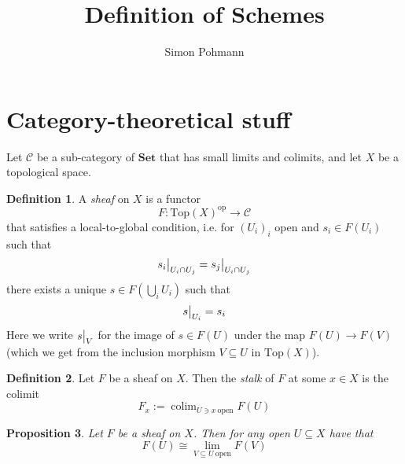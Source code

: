 \documentclass{scrartcl}
\title{Definition of Schemes}
\author{Simon Pohmann}
\newcommand{\Set}{\mathrm{\textbf{Set}}}
\newcommand{\Top}{\mathrm{Top}}
\DeclareMathOperator*{\colim}{colim}
\newcommand\restr[2]{{
    \left.\kern-\nulldelimiterspace
    #1
    \vphantom{\big|}
    \right|_{#2}
}}
\newtheorem{prop}{Proposition}[section]
\theoremstyle{definition}
\newtheorem{definition}[prop]{Definition}
\begin{document}
\maketitle
\tableofcontents

\section{Category-theoretical stuff}
Let $\mathcal{C}$ be a sub-category of $\Set$ that has small limits and colimits, and let $X$ be a topological space.
\begin{definition}
    A \emph{sheaf} on $X$ is a functor
    \begin{equation*}
        F: \Top(X)^{\mathrm{op}} \to \mathcal{C}
    \end{equation*}
    that satisfies a local-to-global condition, i.e. for $(U_i)_i$ open and $s_i \in F(U_i)$ such that
    \begin{equation*}
        \restr{s_i}{U_i \cap U_j} = \restr{s_j}{U_i \cap U_j}
    \end{equation*}
    there exists a unique $s \in F(\bigcup_i U_i)$ such that
    \begin{equation*}
        \restr{s}{U_i} = s_i
    \end{equation*}
    Here we write $\restr{s}{V}$ for the image of $s \in F(U)$ under the map $F(U) \to F(V)$ (which we get from the inclusion morphism $V \subseteq U$ in $\Top(X)$).
\end{definition}
\begin{definition}
    Let $F$ be a sheaf on $X$. Then the \emph{stalk} of $F$ at some $x \in X$ is the colimit
    \begin{equation*}
        F_x := \colim_{U \ni x \ \text{open}} F(U)
    \end{equation*}
\end{definition}
\begin{prop}
    Let $F$ be a sheaf on $X$.
    Then for any open $U \subseteq X$ have that
    \begin{equation*}
        F(U) \cong \lim_{V \subseteq U \ \text{open}} F(V)
    \end{equation*}
\end{prop}
\end{document}

